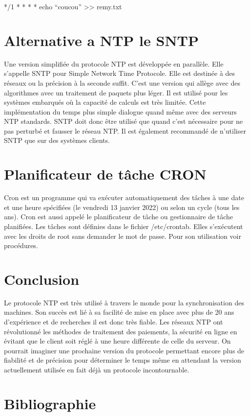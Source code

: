 \documentclass[a4paper]{article}
\begin{document}
\begin{adjustwidth}{-2cm}{-2cm}
 */1 * * * * echo “coucou” >> remy.txt


 \newpage
 \section{Alternative a NTP le SNTP}
 Une version simplifiée du protocole NTP est développée en parallèle. Elle s’appelle SNTP pour Simple Network Time Protocole. Elle est destinée à des réseaux ou la précision à la seconde suffit. C’est une version qui allège avec des algorithmes avec un traitement de paquets plus léger. Il est utilisé pour les systèmes embarqués où la capacité de calculs est très limitée. Cette implémentation du temps plus simple dialogue quand même avec des serveurs NTP standards. SNTP doit donc être utilisé que quand c’est nécessaire pour ne pas perturbé et fausser le réseau NTP. Il est également recommandé de n’utiliser SNTP que sur des systèmes clients.
 \newpage
 \section{ Planificateur de tâche CRON}
Cron est un programme qui va exécuter automatiquement des tâches à une date et une heure spécifiées (le vendredi 13 janvier 2022) ou selon un cycle (tous les ans).
Cron est aussi appelé le planificateur de tâche ou gestionnaire de tâche planifiées.
Les tâches sont définies dans le fichier /etc/crontab. Elles s'exécutent avec les droits de root sans demander le mot de passe.
Pour son utilisation voir procédures.

 \newpage
 \section{Conclusion}
 Le protocole NTP est très utilisé à travers le monde pour la synchronisation des machines.
Son succès est lié à sa facilité de mise en place avec plus de 20 ans d'expérience et de recherches il est donc très fiable. Les réseaux NTP ont révolutionné les méthodes de traitement des paiements, la sécurité en ligne en évitant que le client soit réglé à une heure différente de celle du serveur. On pourrait imaginer une prochaine version du protocole permettant encore plus de fiabilité et de précision pour déterminer le temps même en attendant la version actuellement utilisée en fait déjà un protocole incontournable.

\newpage
 \section{Bibliographie}
\begin{thebibliography}{99}


\end{thebibliography}
\end{adjustwidth}
\end{document}
